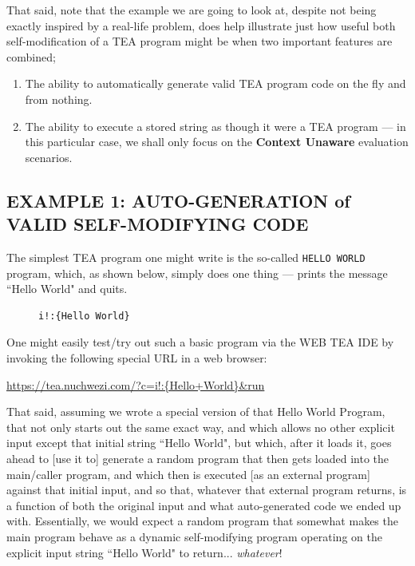 \documentclass[a4paper, 18pt]{book} %
\begin{document}
That said, note that the example we are going to look at, despite not being exactly inspired by a real-life problem, does help illustrate just how useful both self-modification of a TEA program might be when two important features are combined; 

\begin{enumerate}
\item The ability to automatically generate valid TEA program code on the fly and from nothing.
\item The ability to execute a stored string as though it were a TEA program --- in this particular case, we shall only focus on the \textbf{Context Unaware} evaluation scenarios.
\end{enumerate}


\subsection{EXAMPLE 1: AUTO-GENERATION of VALID SELF-MODIFYING CODE}
\label{SECEXAMP1E}


The simplest TEA program one might write is the so-called \texttt{HELLO WORLD} program, which, as shown below, simply does one thing --- prints the message ``Hello World" and quits.


\begin{figure}[H]
 \Large
  \centering
  \begin{tcolorbox}[teaterminalstyle, title=A Basic TEA Hello World Program]
  \begin{lstlisting}[language=TEA]
i!:{Hello World}
   \end{lstlisting}
  \end{tcolorbox}
\end{figure}


One might easily test/try out such a basic program via the WEB TEA IDE by invoking the following special URL in a web browser:

\vspace{1em}

 \url{https://tea.nuchwezi.com/?c=i!:{Hello+World}&run}

\vspace{1em}
That said, assuming we wrote a special version of that Hello World Program, that not only starts out the same exact way, and which allows no other explicit input except that initial string ``Hello World", but which, after it loads it, goes ahead to [use it to] generate a random program that then gets loaded into the main/caller program, and which then is executed [as an external program] against that initial input, and so that, whatever that external program returns, is a function of both the original input and what auto-generated code we ended up with. Essentially, we would expect a random program that somewhat makes the main program behave as a dynamic self-modifying program operating on the explicit input string ``Hello World" to return... \textit{whatever}!
\end{document}
